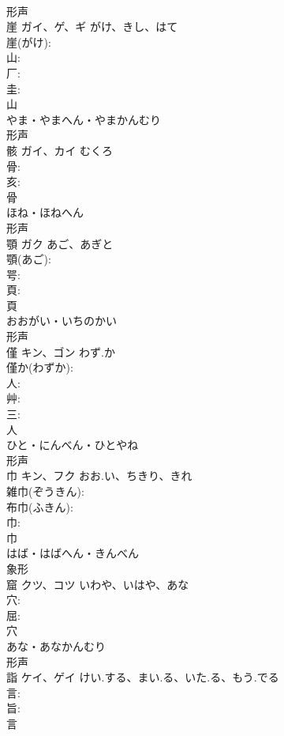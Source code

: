 \documentclass[8pt]{extreport}
\begin{document}
\begin{CJK}{UTF8}{min}
\\	形声 
\\	崖	ガイ、ゲ、ギ	がけ、きし、はて		
\\	崖(がけ): 
\\	山: 
\\	厂: 
\\	圭: 
\\	山	
\\	やま・やまへん・やまかんむり	
\\	形声 
\\	骸	ガイ、カイ	むくろ		
\\	骨: 
\\	亥: 
\\	骨	
\\	ほね・ほねへん	
\\	形声 
\\	顎	ガク	あご、あぎと		
\\	顎(あご): 
\\	咢: 
\\	頁: 
\\	頁	
\\	おおがい・いちのかい	
\\	形声 
\\	僅	キン、ゴン	わず.か		
\\	僅か(わずか): 
\\	人: 
\\	艸: 
\\	三: 
\\	人	
\\	ひと・にんべん・ひとやね	
\\	形声 
\\	巾	キン、フク	おお.い、ちきり、きれ		
\\	雑巾(ぞうきん): 
\\	布巾(ふきん): 
\\	巾: 
\\	巾	
\\	はば・はばへん・きんべん	
\\	象形 
\\	窟	クツ、コツ	いわや、いはや、あな		
\\	穴: 
\\	屈: 
\\	穴	
\\	あな・あなかんむり	
\\	形声 
\\	詣	ケイ、ゲイ	けい.する、まい.る、いた.る、もう.でる		
\\	言: 
\\	旨: 
\\	言	

\end{CJK}
\end{document}

